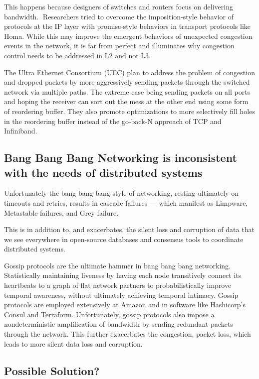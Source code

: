This happens because designers of switches and routers focus on delivering bandwidth. 
Researchers tried to overcome the imposition-style behavior of protocols at the IP layer with promise-style behaviors in transport protocols like Homa.  While this may improve the emergent behaviors of unexpected congestion events in the network, it is far from perfect and illuminates why congestion  control needs to be addressed in L2 and not L3.

The Ultra Ethernet Consortium (UEC) plan to address the problem of congestion and dropped packets by more aggressively sending packets through the switched network via multiple paths. The extreme case being sending packets on all ports and hoping the receiver can sort out the mess at the other end using some form of reordering buffer. They also promote optimizations to more selectively fill holes in the reordering buffer instead of the go-back-N approach of TCP and Infiniband.

\subsection{Bang Bang Bang Networking is inconsistent with the needs of distributed systems}

Unfortunately the bang bang bang style of networking, resting ultimately on timeouts and retries, results in cascade failures — which manifest as Limpware, Metastable failures, and Grey failure.

This is in addition to, and exacerbates, the silent loss and corruption of data that we see everywhere in open-source databases and consensus tools to coordinate distributed systems. 

Gossip protocols are the ultimate hammer in bang bang bang networking. Statistically maintaining liveness by having each node transitively connect its heartbeats to a graph of flat network partners to probabilistically improve temporal awareness, without ultimately achieving temporal intimacy. Gossip protocols are employed extensively at Amazon and in software like Hashicorp’s Consul and Terraform.
Unfortunately, gossip protocols also impose a nondeterministic amplification of bandwidth by sending redundant packets through the network.  This further exacerbates the congestion, packet loss, which leads to more silent data loss and corruption.

\subsection{Possible Solution?}

